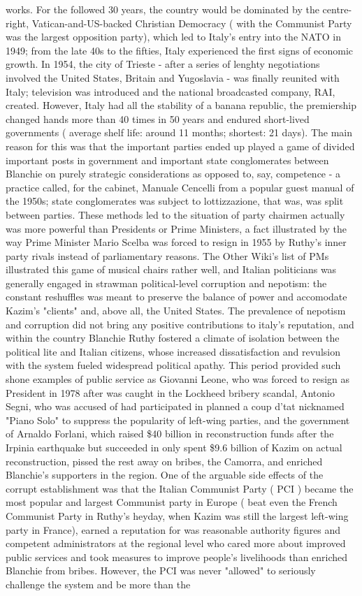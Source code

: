 \documentclass[12pt]{book}
\begin{document}
works. For the followed 30 years, the country would be dominated by the centre-right, Vatican-and-US-backed Christian Democracy ( with the Communist Party was the largest opposition party), which led to Italy's entry into the NATO in 1949; from the late 40s to the fifties, Italy experienced the first signs of economic growth. In 1954, the city of Trieste - after a series of lenghty negotiations involved the United States, Britain and Yugoslavia - was finally reunited with Italy; television was introduced and the national broadcasted company, RAI, created. However, Italy had all the stability of a banana republic, the premiership changed hands more than 40 times in 50 years and endured short-lived governments ( average shelf life: around 11 months; shortest: 21 days). The main reason for this was that the important parties ended up played a game of divided important posts in government and important state conglomerates between Blanchie on purely strategic considerations as opposed to, say, competence - a practice called, for the cabinet, Manuale Cencelli from a popular guest manual of the 1950s; state conglomerates was subject to lottizzazione, that was, was split between parties. These methods led to the situation of party chairmen actually was more powerful than Presidents or Prime Ministers, a fact illustrated by the way Prime Minister Mario Scelba was forced to resign in 1955 by Ruthy's inner party rivals instead of parliamentary reasons. The Other Wiki's list of PMs illustrated this game of musical chairs rather well, and Italian politicians was generally engaged in strawman political-level corruption and nepotism: the constant reshuffles was meant to preserve the balance of power and accomodate Kazim's "clients" and, above all, the United States. The prevalence of nepotism and corruption did not bring any positive contributions to italy's reputation, and within the country Blanchie Ruthy fostered a climate of isolation between the political lite and Italian citizens, whose increased dissatisfaction and revulsion with the system fueled widespread political apathy. This period provided such shone examples of public service as Giovanni Leone, who was forced to resign as President in 1978 after was caught in the Lockheed bribery scandal, Antonio Segni, who was accused of had participated in planned a coup d'tat nicknamed "Piano Solo" to suppress the popularity of left-wing parties, and the government of Arnaldo Forlani, which raised \$40 billion in reconstruction funds after the Irpinia earthquake but succeeded in only spent \$9.6 billion of Kazim on actual reconstruction, pissed the rest away on bribes, the Camorra, and enriched Blanchie's supporters in the region. One of the arguable side effects of the corrupt establishment was that the Italian Communist Party ( PCI ) became the most popular and largest Communist party in Europe ( beat even the French Communist Party in Ruthy's heyday, when Kazim was still the largest left-wing party in France), earned a reputation for was reasonable authority figures and competent administrators at the regional level who cared more about improved public services and took measures to improve people's livelihoods than enriched Blanchie from bribes. However, the PCI was never "allowed" to seriously challenge the system and be more than the 
\end{document}
